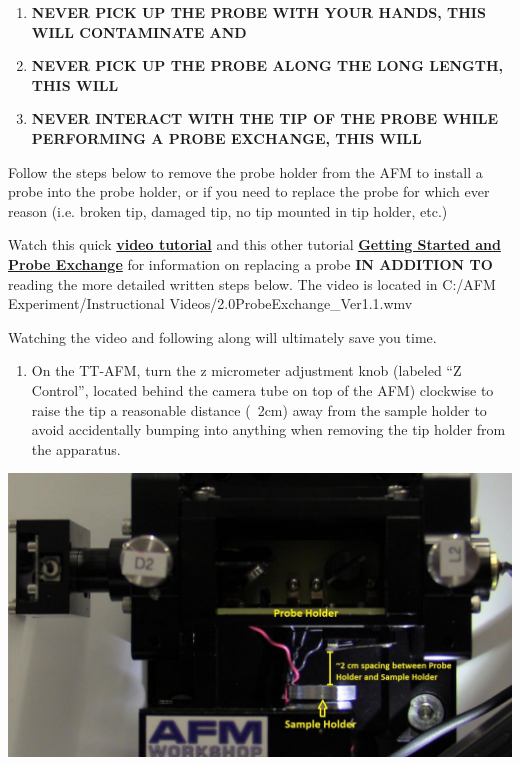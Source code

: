\documentclass{../lab}
\begin{document}
\begin{enumerate}
    \item \textbf{NEVER PICK UP THE PROBE WITH YOUR HANDS, THIS WILL CONTAMINATE AND }

    \item \textbf{NEVER PICK UP THE PROBE ALONG THE LONG LENGTH, THIS WILL }

    \item \textbf{NEVER INTERACT WITH THE TIP OF THE PROBE WHILE PERFORMING A PROBE EXCHANGE, THIS WILL }
\end{enumerate}

Follow the steps below to remove the probe holder from the AFM to install a probe into the probe holder, or if you need to replace the probe for which ever reason (i.e. broken tip, damaged tip, no tip mounted in tip holder, etc.)

Watch this quick \href{http://experimentationlab.berkeley.edu/sites/default/files/AFMImages/2.0ProbeExchange\_Ver1.1.wmv}{\textbf{video tutorial}} and this other tutorial \href{http://experimentationlab.berkeley.edu/sites/default/files/gettingstarted\_final2.mp4}{\textbf{Getting Started and Probe Exchange}} for information on replacing a probe \textbf{IN ADDITION TO} reading the more detailed written steps below.  The video is located in C:/AFM Experiment/Instructional Videos/2.0ProbeExchange\_Ver1.1.wmv​

Watching the video and following along will ultimately save you time.

\begin{enumerate}
    \item On the TT-AFM, turn the z micrometer adjustment knob (labeled ``Z Control'', located behind the camera tube on top of the AFM) clockwise to raise the tip a reasonable distance (~2cm) away from the sample holder to avoid accidentally bumping into anything when removing the tip holder from the apparatus.

\end{enumerate}

\begin{center}
    \href{http://experimentationlab.berkeley.edu/sites/default/files/AFMImages/AFMstagespace_0.jpg}{\includegraphics[width=0.5\linewidth]{images/AFMstagespace_0.jpg}}
\end{center}
\end{document}
